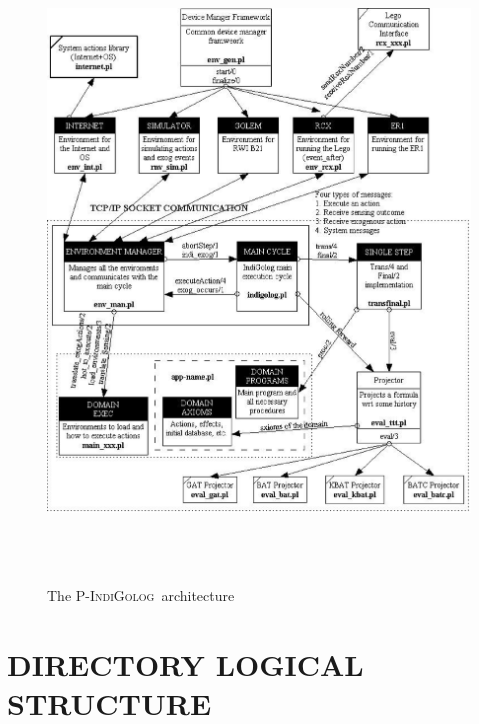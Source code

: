 \documentclass[11pt]{article}
\newcommand{\PIndiGolog}{\mbox{\textsc{P-IndiGolog}}}
\begin{document}
\begin{figure}[b]
\begin{center}
\includegraphics[height=17cm,width=17cm]{system.eps}
\caption{The \PIndiGolog\ architecture}
\label{FigLeGolog}
\end{center}
\end{figure}



\section{DIRECTORY LOGICAL STRUCTURE} \label{sec:dirstruct}
\end{document}
